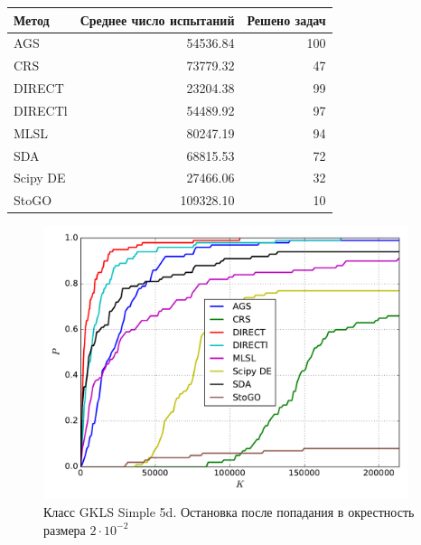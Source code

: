 \documentclass[a4paper]{article}
\begin{document}
\begin{tabular}{lrr}
\hline
 Метод    &   Среднее число испытаний &   Решено задач \\
\hline
 AGS      &                  54536.84 &            100 \\
 CRS      &                  73779.32 &             47 \\
 DIRECT   &                  23204.38 &             99 \\
 DIRECTl  &                  54489.92 &             97 \\
 MLSL     &                  80247.19 &             94 \\
 SDA      &                  68815.53 &             72 \\
 Scipy DE &                  27466.06 &             32 \\
 StoGO    &                 109328.10 &             10 \\
\hline
\end{tabular}
\begin{figure}[H]
  \center
  \includegraphics[width=0.95\textwidth]{../experiments/gklss5d/cmc.pdf}
  \caption{Класс GKLS Simple 5d. Остановка после попадания в окрестность размера $2\cdot10^{-2}$}
  \label{fig:}
\end{figure}
\end{document}
